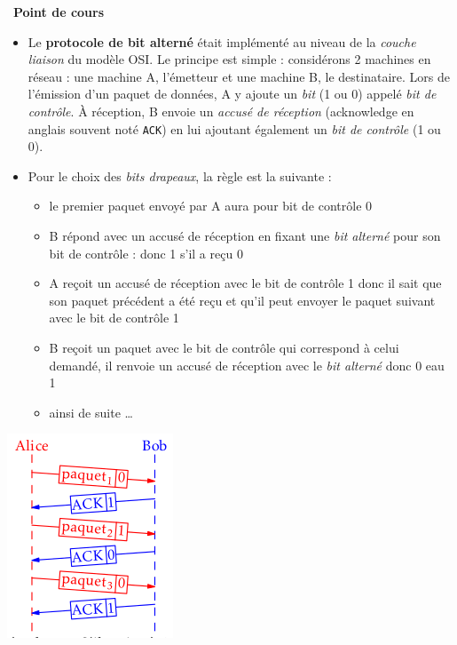 \documentclass[
  11pt,
]{article}
\newcommand{\passthrough}[1]{#1}
\providecommand{\tightlist}{%
  \setlength{\itemsep}{0pt}\setlength{\parskip}{0pt}}
\newcounter{cours}
\newenvironment{cours}[1]
{\par \medskip   \addtocounter{cours}{1} \noindent  
\begin{bclogo}[arrondi =0.1,  ombre = true, barre=none, logo=\bcbook, marge=4]{~\textbf{Point de cours} \textbf{\thecours} {\itshape #1} }  \par}
{
\end{bclogo}
 \par \bigskip }
\begin{document}
\begin{cours}{}

\begin{itemize}
\item
  Le \textbf{protocole de bit alterné} était implémenté au niveau de la
  \emph{couche liaison} du modèle OSI. Le principe est simple :
  considérons 2 machines en réseau : une machine A, l'émetteur et une
  machine B, le destinataire. Lors de l'émission d'un paquet de données,
  A y ajoute un \emph{bit} (1 ou 0) appelé \emph{bit de contrôle}. À
  réception, B envoie un \emph{accusé de réception} (acknowledge en
  anglais souvent noté \passthrough{\lstinline!ACK!}) en lui ajoutant
  également un \emph{bit de contrôle} (1 ou 0).
\item
  Pour le choix des \emph{bits drapeaux}, la règle est la suivante :

  \begin{itemize}
  \tightlist
  \item
    le premier paquet envoyé par A aura pour bit de contrôle 0
  \item
    B répond avec un accusé de réception en fixant une \emph{bit
    alterné} pour son bit de contrôle : donc 1 s'il a reçu 0
  \item
    A reçoit un accusé de réception avec le bit de contrôle 1 donc il
    sait que son paquet précédent a été reçu et qu'il peut envoyer le
    paquet suivant avec le bit de contrôle 1
  \item
    B reçoit un paquet avec le bit de contrôle qui correspond à celui
    demandé, il renvoie un accusé de réception avec le \emph{bit
    alterné} donc 0 eau 1
  \item
    ainsi de suite \ldots{}
  \end{itemize}
\end{itemize}

\includegraphics{images/bit_alterne1.png}\\


\end{cours}
\end{document}
